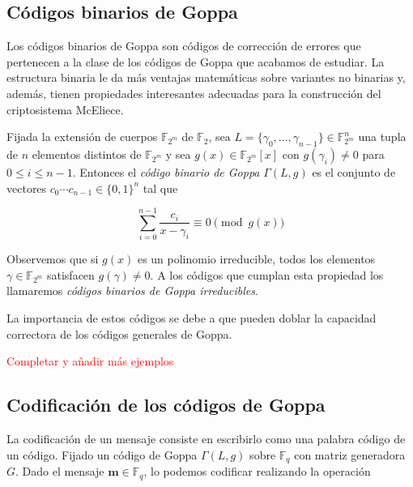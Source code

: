 \subsection{Códigos binarios de Goppa}

Los códigos binarios de Goppa son códigos de corrección de errores que pertenecen a la clase de los códigos de Goppa que acabamos de estudiar. La estructura binaria le da más ventajas matemáticas sobre variantes no binarias y, además, tienen propiedades interesantes adecuadas para la construcción del criptosistema McEliece.

\begin{definition}

    Fijada la extensión de cuerpos $\mathbb{F}_{2^m}$ de $\mathbb{F}_2$, sea $L = \{ \gamma_0, ..., \gamma_{n-1} \} \in \mathbb{F}_{2^m}^n$ una tupla de $n$ elementos distintos de $\mathbb{F}_{2^m}$ y sea $g(x) \in \mathbb{F}_{2^m}[x]$ con $g(\gamma_i) \neq 0$ para $0 \leq i \leq n - 1$. Entonces el \emph{código binario de Goppa} $\Gamma(L,g)$ es el conjunto de vectores $c_0 \cdots c_{n-1} \in \{ 0, 1 \}^n$ tal que 

    \begin{equation}
        \sum_{i=0}^{n-1} \frac{c_i}{x - \gamma_i} \equiv 0 \pmod{g(x)}
    \end{equation}
\end{definition}

Observemos que si $g(x)$ es un polinomio irreducible, todos los elementos $\gamma \in \mathbb{F}_{2^m}$ satisfacen $g(\gamma) \neq 0$. A los códigos que cumplan esta propiedad los llamaremos \emph{códigos binarios de Goppa irreducibles}.

La importancia de estos códigos se debe a que pueden doblar la capacidad correctora de los códigos generales de Goppa.


\begin{exampleth}
\end{exampleth}

\textcolor{red}{Completar y añadir más ejemplos}

\subsection{Codificación de los códigos de Goppa}

La codificación de un mensaje consiste en escribirlo como una palabra código de un código. Fijado un código de Goppa $\Gamma (L, g)$ sobre $\mathbb{F}_q$ con matriz generadora $G$. Dado el mensaje $\textbf{m} \in \mathbb{F}_q$, lo podemos codificar realizando la operación

